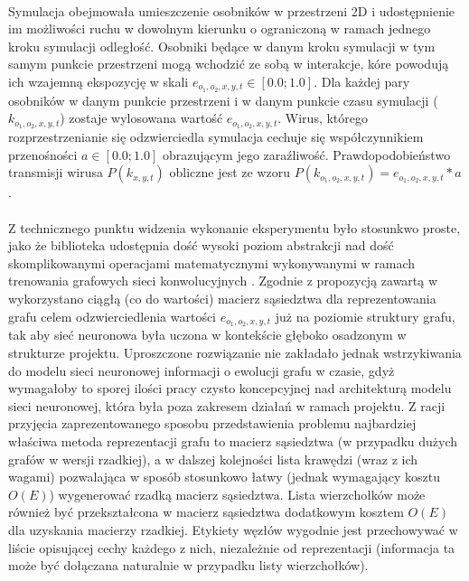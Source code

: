 \documentclass{article}
\begin{document}
\paragraph{}
Symulacja obejmowała umieszczenie osobników w przestrzeni 2D i udostępnienie im możliwości ruchu w dowolnym kierunku o ograniczoną w ramach jednego kroku symulacji odległość. Osobniki będące w danym kroku symulacji w tym samym punkcie przestrzeni mogą wchodzić ze sobą w interakcje, kóre powodują ich wzajemną ekspozycję w skali $e_{o_1, o_2, x, y, t} \in [0.0; 1.0]$. Dla każdej pary osobników w danym punkcie przestrzeni i w danym punkcie czasu symulacji ($k_{o_1, o_2, x, y, t}$) zostaje wylosowana wartość $e_{o_1, o_2, x, y, t}$. Wirus, którego rozprzestrzenianie się odzwierciedla symulacja cechuje się współczynnikiem przenośności $a \in [0.0; 1.0]$ obrazującym jego zaraźliwość. Prawdopodobieństwo transmisji wirusa $P(k_{x, y, t})$ obliczne jest ze wzoru $P(k_{o_1, o_2, x, y, t}) = e_{o_1, o_2, x, y, t} * a$.

\paragraph{}
Z technicznego punktu widzenia wykonanie eksperymentu było stosunkwo proste, jako że biblioteka udostępnia dość wysoki poziom abstrakcji nad dość skomplikowanymi operacjami matematycznymi wykonywanymi w ramach trenowania grafowych sieci konwolucyjnych \cite{gcn}. Zgodnie z propozycją zawartą w \cite{gcn} wykorzystano ciągłą (co do wartości) macierz sąsiedztwa dla reprezentowania grafu celem odzwierciedlenia wartości $e_{o_1, o_2, x, y, t}$ już na poziomie struktury grafu, tak aby sieć neuronowa była uczona w kontekście głęboko osadzonym w strukturze projektu. Uproszczone rozwiązanie nie zakładało jednak wstrzykiwania do modelu sieci neuronowej informacji o ewolucji grafu w czasie, gdyż wymagałoby to sporej ilości pracy czysto koncepcyjnej nad architekturą modelu sieci neuronowej, która była poza zakresem działań w ramach projektu. Z racji przyjęcia zaprezentowanego sposobu przedstawienia problemu najbardziej właściwa metoda reprezentacji grafu to macierz sąsiedztwa (w przypadku dużych grafów w wersji rzadkiej), a w dalszej kolejności lista krawędzi (wraz z ich wagami) pozwalająca w sposób stosunkowo łatwy (jednak wymagający kosztu $O(E)$) wygenerować rzadką macierz sąsiedztwa. Lista wierzchołków może również być przekształcona w macierz sąsiedztwa dodatkowym kosztem $O(E)$ dla uzyskania macierzy rzadkiej. Etykiety węzłów wygodnie jest przechowywać w liście opisującej cechy każdego z nich, niezależnie od reprezentacji (informacja ta może być dołączana naturalnie w przypadku listy wierzchołków).
\end{document}
